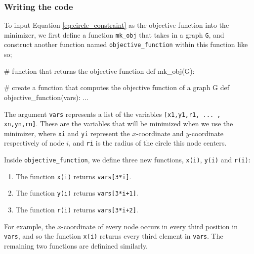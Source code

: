 \subsubsection{Writing the code}

\begin{flushleft}
To input Equation \ref{eq:circle_constraint} as the objective function into the minimizer, we first define a function \texttt{mk\_obj} that takes in a graph \texttt{G}, and construct another function named \texttt{objective\_function} within this function like so;
\end{flushleft}

\begin{code}
    # function that returns the objective function
    def mk_obj(G):
        
        # create a function that computes the objective function of a graph G
        def objective_function(vars):
        ...
\end{code}

\begin{flushleft}
The argument \texttt{vars} represents a list of the variables \texttt{[x1,y1,r1, ... , xn,yn,rn]}. These are the variables that will be minimized when we use the minimizer, where \texttt{xi} and \texttt{yi} represent the $x$-coordinate and $y$-coordinate respectively of node $i$, and \texttt{ri} is the radius of the circle this node centers.
\end{flushleft}

\begin{flushleft}
Inside \texttt{objective\_function}, we define three new functions, \texttt{x(i)}, \texttt{y(i)} and \texttt{r(i)}:

\begin{enumerate}
    \item The function \texttt{x(i)} returns \texttt{vars[3*i]}.
    \vspace{-3mm}
    \item The function \texttt{y(i)} returns \texttt{vars[3*i+1]}.
    \vspace{-3mm}
    \item The function \texttt{r(i)} returns \texttt{vars[3*i+2]}.
\end{enumerate}

For example, the $x$-coordinate of every node occurs in every third position in \texttt{vars}, and so the function \texttt{x(i)} returns every third element in \texttt{vars}. The remaining two functions are definined similarly.
\end{flushleft}

